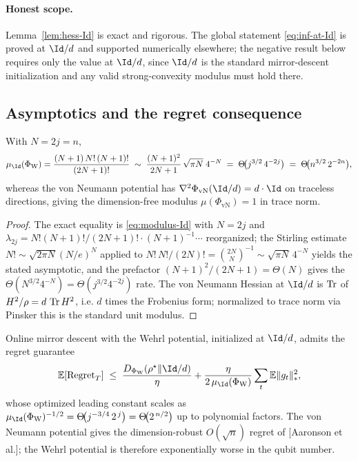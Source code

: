\paragraph{Honest scope.} Lemma~\ref{lem:hess-Id} is exact and rigorous. The
global statement \eqref{eq:inf-at-Id} is proved at $\Id/d$ and supported
numerically elsewhere; the negative result below requires only the value at
$\Id/d$, since $\Id/d$ is the standard mirror-descent initialization and any
valid strong-convexity modulus must hold there.

\subsection{Asymptotics and the regret consequence}

\begin{theorem}
\label{thm:collapse}
With $N=2j=n$,
\begin{equation}
  \mu_{\Id}(\Phi_{\mathrm W})
  =\frac{(N+1)\,N!\,(N+1)!}{(2N+1)!}
  \;\sim\;\frac{(N+1)^{2}}{2N+1}\,\sqrt{\pi N}\;4^{-N}
  \;=\;\Theta\!\big(j^{3/2}\,4^{-2j}\big)
  \;=\;\Theta\!\big(n^{3/2}\,2^{-2n}\big),
  \label{eq:asymptotic}
\end{equation}
whereas the von Neumann potential has $\Hess\Phi_{\mathrm{vN}}(\Id/d)=d\cdot\Id$
on traceless directions, giving the dimension-free modulus
$\mu(\Phi_{\mathrm{vN}})=1$ in trace norm.
\end{theorem}

\begin{proof}
The exact equality is \eqref{eq:modulus-Id} with $N=2j$ and
$\lambda_{2j}=N!(N+1)!/(2N+1)!\cdot(N+1)^{-1}\cdots$ reorganized; the Stirling
estimate $N!\sim\sqrt{2\pi N}(N/e)^N$ applied to
$N!\,N!/(2N)!=\binom{2N}{N}^{-1}\sim\sqrt{\pi N}\,4^{-N}$ yields the stated
asymptotic, and the prefactor $(N+1)^2/(2N+1)=\Theta(N)$ gives the
$\Theta(N^{3/2}4^{-N})=\Theta(j^{3/2}4^{-2j})$ rate. The von Neumann Hessian at
$\Id/d$ is $\operatorname{Tr}$ of $H^2/\rho=d\,\operatorname{Tr} H^2$, i.e. $d$ times the Frobenius form;
normalized to trace norm via Pinsker this is the standard unit modulus.
\end{proof}

\begin{corollary}
\label{cor:regret}
Online mirror descent with the Wehrl potential, initialized at $\Id/d$, admits
the regret guarantee
\begin{equation}
  \E[\Reg_T]\;\le\;\frac{D_{\Phi_{\mathrm W}}(\rho^\star\|\Id/d)}{\eta}
  +\frac{\eta}{2\,\mu_{\Id}(\Phi_{\mathrm W})}\sum_{t}\E\lVert g_t\rVert_*^2,
\end{equation}
whose optimized leading constant scales as
$\mu_{\Id}(\Phi_{\mathrm W})^{-1/2}=\Theta\!\big(j^{-3/4}\,2^{\,j}\big)
=\Theta\!\big(2^{\,n/2}\big)$ up to polynomial factors. The von Neumann
potential gives the dimension-robust $O(\sqrt{n})$ regret of
[Aaronson et al.]; the Wehrl potential is therefore exponentially worse in the
qubit number.
\end{corollary}

